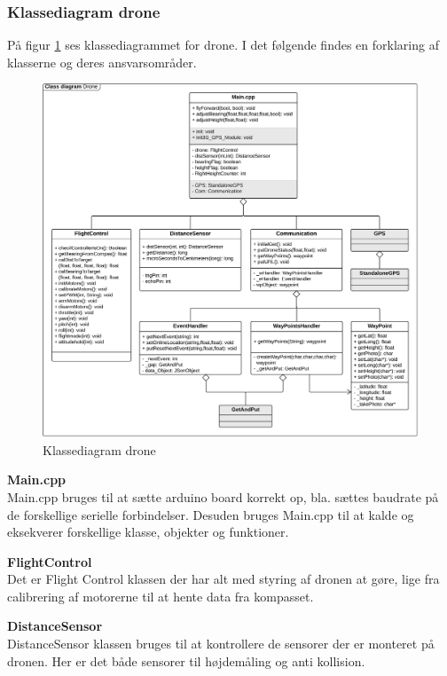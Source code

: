 \newpage
\subsubsection*{Klassediagram drone}

På figur \ref{fig:classDiagram_drone_underflyvning} ses klassediagrammet for drone. I det følgende findes en forklaring af klasserne og deres ansvarsområder. 

\begin{figure}[H]
	\centering
	\includegraphics[width=1\textwidth]{Billeder/klasse_diagrammer/classdiagram_iteration2_drone.png}
	\vspace{-0.7cm}
	\caption{Klassediagram drone}
	\label{fig:classDiagram_drone_underflyvning}
\end{figure}

\textbf{Main.cpp} \\
Main.cpp bruges til at sætte arduino board korrekt op, bla. sættes baudrate på de forskellige serielle forbindelser. Desuden bruges Main.cpp til at kalde og eksekverer forskellige klasse, objekter og funktioner.

\textbf{FlightControl} \\
Det er Flight Control klassen der har alt med styring af dronen at gøre, lige fra calibrering af motorerne til at hente data fra kompasset. 

\textbf{DistanceSensor} \\
DistanceSensor klassen bruges til at kontrollere de sensorer der er monteret på dronen. Her er det både sensorer til højdemåling og anti kollision. 

